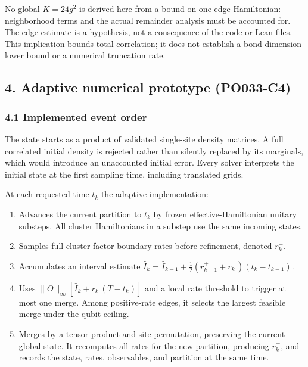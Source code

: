 \documentclass[
]{article}
\providecommand{\tightlist}{%
  \setlength{\itemsep}{0pt}\setlength{\parskip}{0pt}}
\providecommand{\tightlist}{%
  \setlength{\itemsep}{0pt}\setlength{\parskip}{0pt}}
\begin{document}
No global \(K=24g^2\) is derived here from a bound on one edge Hamiltonian: neighborhood terms and the actual remainder analysis must be accounted for. The edge estimate is a hypothesis, not a consequence of the code or Lean files. This implication bounds total correlation; it does not establish a bond-dimension lower bound or a numerical truncation rate.

\subsection{4. Adaptive numerical prototype (PO033-C4)}\label{adaptive-numerical-prototype-po033-c4}

\subsubsection{4.1 Implemented event order}\label{implemented-event-order}

The state starts as a product of validated single-site density matrices. A full correlated initial density is rejected rather than silently replaced by its marginals, which would introduce an unaccounted initial error. Every solver interprets the initial state at the first sampling time, including translated grids.

At each requested time \(t_k\) the adaptive implementation:

\begin{enumerate}
\def\labelenumi{\arabic{enumi}.}
\tightlist
\item
  Advances the current partition to \(t_k\) by frozen effective-Hamiltonian unitary substeps. All cluster Hamiltonians in a substep use the same incoming states.
\item
  Samples full cluster-factor boundary rates before refinement, denoted \(r_k^-\).
\item
  Accumulates an interval estimate
  \(\widehat I_k=\widehat I_{k-1}+\tfrac12(r_{k-1}^++r_k^-)(t_k-t_{k-1})\).
\item
  Uses \(\|O\|_\infty[\widehat I_k+r_k^-(T-t_k)]\) and a local rate threshold to trigger at most one merge. Among positive-rate edges, it selects the largest feasible merge under the qubit ceiling.
\item
  Merges by a tensor product and site permutation, preserving the current global state. It recomputes all rates for the new partition, producing \(r_k^+\), and records the state, rates, observables, and partition at the same time.
\end{enumerate}
\end{document}
